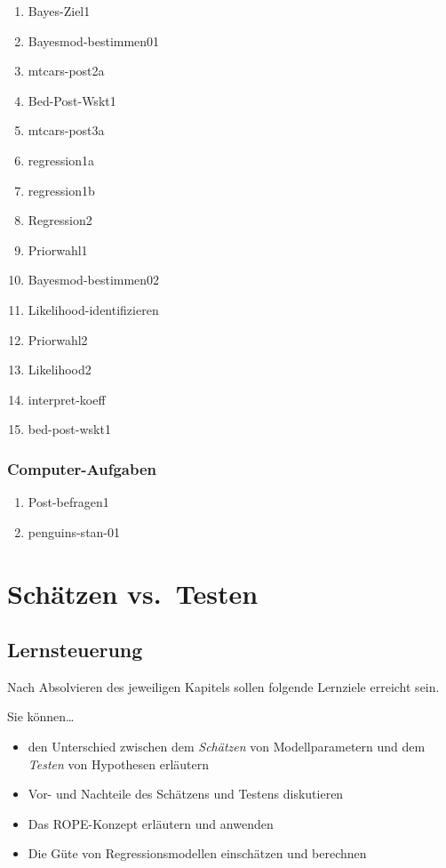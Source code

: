 \documentclass[
  ngerman,
  letterpaper,
  twoside,
  open=any]{scrbook}
\providecommand{\tightlist}{%
  \setlength{\itemsep}{0pt}\setlength{\parskip}{0pt}}\usepackage{longtable,booktabs,array}
\theoremstyle{definition}
\theoremstyle{plain}
\theoremstyle{definition}
\theoremstyle{definition}
\theoremstyle{definition}
\theoremstyle{definition}
\theoremstyle{remark}
\begin{document}
\begin{enumerate}
\def\labelenumi{\arabic{enumi}.}
\tightlist
\item
  Bayes-Ziel1
\item
  Bayesmod-bestimmen01
\item
  mtcars-post2a
\item
  Bed-Post-Wskt1
\item
  mtcars-post3a
\item
  regression1a
\item
  regression1b
\item
  Regression2
\item
  Priorwahl1
\item
  Bayesmod-bestimmen02
\item
  Likelihood-identifizieren
\item
  Priorwahl2
\item
  Likelihood2
\item
  interpret-koeff
\item
  bed-post-wskt1
\end{enumerate}

\subsection{Computer-Aufgaben}\label{computer-aufgaben}

\begin{enumerate}
\def\labelenumi{\arabic{enumi}.}
\tightlist
\item
  Post-befragen1
\item
  penguins-stan-01
\end{enumerate}

\chapter{Schätzen vs.~Testen}\label{schuxe4tzen-vs.-testen}

\section{Lernsteuerung}\label{lernsteuerung-9}

Nach Absolvieren des jeweiligen Kapitels sollen folgende Lernziele
erreicht sein.

Sie können\ldots{}

\begin{itemize}
\tightlist
\item
  den Unterschied zwischen dem \emph{Schätzen} von Modellparametern und
  dem \emph{Testen} von Hypothesen erläutern
\item
  Vor- und Nachteile des Schätzens und Testens diskutieren
\item
  Das ROPE-Konzept erläutern und anwenden
\item
  Die Güte von Regressionsmodellen einschätzen und berechnen
\end{itemize}
\end{document}
